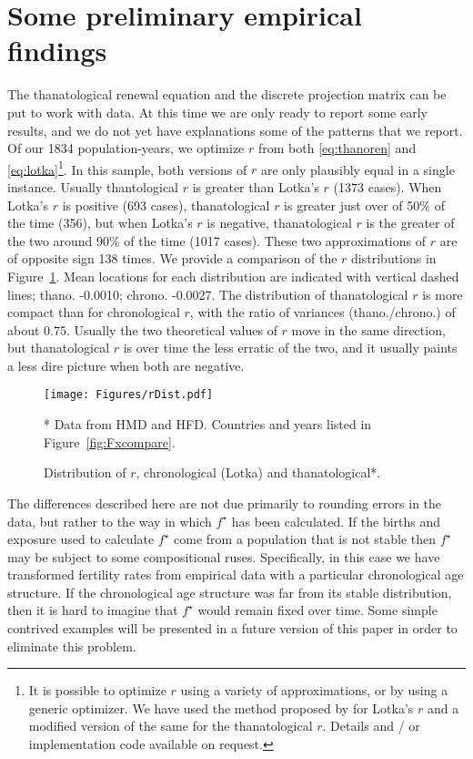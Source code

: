 \documentclass{article}
\begin{document}
\section*{Some preliminary empirical findings}
The thanatological renewal equation and the discrete projection matrix can be
put to work with data. At this time we are only ready to report some early
results, and we do not yet have explanations some of the patterns that we
report. Of our 1834 population-years, we optimize $r$ from both
\eqref{eq:thanoren} and \eqref{eq:lotka}\footnote{It is possible to optimize $r$ using a variety of approximations, or by using a generic optimizer. We have used the method proposed by \citet{coale1957new} for Lotka's $r$ and a modified version of the same for
the thanatological $r$. Details and / or implementation code available on
request.}. In this sample, both versions of $r$ are only plausibly equal in a
single instance. Usually thantological $r$ is greater than Lotka's $r$ (1373
cases). When Lotka's $r$ is positive (693 cases), thanatological $r$ is greater
just over of 50\% of the time (356), but when Lotka's $r$ is negative,
thanatological $r$ is the greater of the two around 90\% of the time (1017
cases). These two approximations of $r$ are of opposite sign 138 times. We
provide a comparison of the $r$ distributions in Figure~\ref{fig:rDist}. Mean
locations for each distribution are indicated with vertical dashed lines; thano.
-0.0010; chrono. -0.0027. The distribution of thanatological $r$ is more compact
than for chronological $r$, with the ratio of variances (thano./chrono.) of
about 0.75. Usually the two theoretical values of $r$ move in the same direction, but thanatological $r$
is over time the less erratic of the two, and it usually paints a less dire picture when both are negative.

\begin{figure}[h!]
	\caption{Distribution of $r$, chronological (Lotka) and thanatological*.}
	\begin{center}
		\label{fig:rDist}
		\texttt{[image: Figures/rDist.pdf]}
	\end{center}
	\begin{tiny}
     * Data from HMD and HFD. Countries and years listed in
     Figure~\ref{fig:Fxcompare}.
	\end{tiny}
\end{figure}

The differences described here are not due primarily to rounding errors in the
data, but rather to the way in which $f^\star$ has been calculated. If the
births and exposure used to calculate $f^\star$ come from a population that is not stable
then $f^\star$ may be subject to some compositional ruses. Specifically, in this
case we have transformed fertility rates from empirical data with a particular
chronological age structure. If the chronological age structure was far from its
stable distribution, then it is hard to imagine that $f^\star$ would remain
fixed over time. Some simple contrived examples will be presented in a future
version of this paper in order to eliminate this problem.
\end{document}
